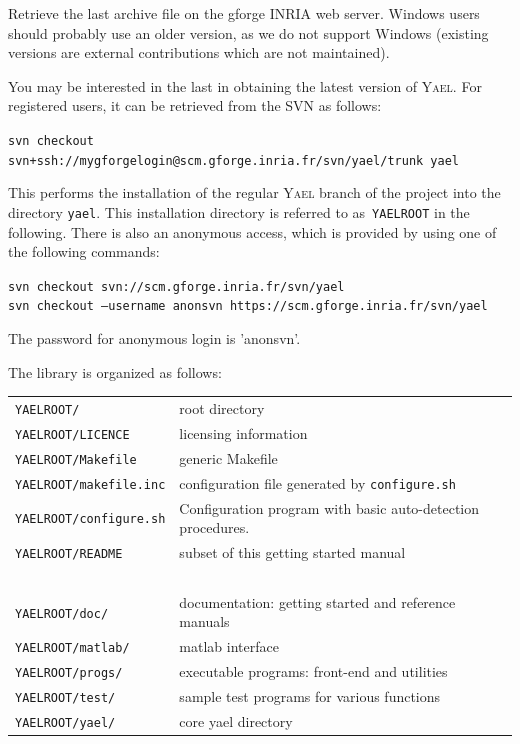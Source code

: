 \documentclass[a4paper,11pt,notitlepage,final,twoside]{report}
\newcommand{\yael}{\textsc{Yael}\xspace}
\newcommand{\yroot}{\texttt{YAELROOT}\xspace}
\newcommand{\tc}[1]{\texttt{#1}}
\newcommand{\code}[1]{\smallskip 

\texttt{#1} 
 \medskip

}
\begin{document}
Retrieve the last archive file on the gforge INRIA web server. 
Windows users should probably use an older version, as we do not support Windows (existing 
versions are external contributions which are not maintained). 
\medskip

You may be interested in the last in obtaining the latest version of \yael. 
For registered users, it can be retrieved from the SVN as follows:

\code{svn checkout svn+ssh://mygforgelogin@scm.gforge.inria.fr/svn/yael/trunk yael}

This performs the installation of the regular \yael branch of the project into the directory \texttt{yael}. 
This installation directory is referred to as~\yroot in the following. 
There is also an anonymous access, which is provided by using one of the following commands:

\code{svn checkout svn://scm.gforge.inria.fr/svn/yael \\
svn checkout --username anonsvn https://scm.gforge.inria.fr/svn/yael
}

The password for anonymous login is 'anonsvn'. 
\medskip


The library is organized as follows: 
\smallskip

\begin{tabular}{ll}
\tc{\yroot/}         & root directory \\
\tc{\yroot/LICENCE}  & licensing information \\
\tc{\yroot/Makefile} & generic Makefile \\
\tc{\yroot/makefile.inc}  & configuration file generated by \tc{configure.sh}\\
\tc{\yroot/configure.sh}  & Configuration program with basic auto-detection procedures.  \\
\tc{\yroot/README}   & subset of this getting started manual \\
~\\
\tc{\yroot/doc/}     & documentation: getting started and reference manuals \\
\tc{\yroot/matlab/}  & matlab interface \\
\tc{\yroot/progs/}   & executable programs: front-end and utilities \\
\tc{\yroot/test/}    & sample test programs for various functions \\
\tc{\yroot/yael/}    & core yael directory  \\
\end{tabular}
\end{document}
